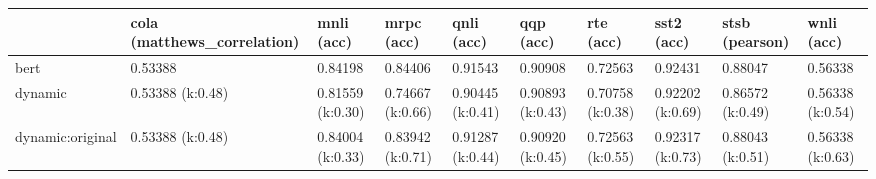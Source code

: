 \begin{tabular}{llllllllll}
\toprule
{} & cola (matthews\_correlation) &        mnli (acc) &        mrpc (acc) &        qnli (acc) &         qqp (acc) &         rte (acc) &        sst2 (acc) &    stsb (pearson) &        wnli (acc) \\
\midrule
bert             &                     0.53388 &           0.84198 &           0.84406 &           0.91543 &           0.90908 &           0.72563 &           0.92431 &           0.88047 &           0.56338 \\
dynamic          &            0.53388 (k:0.48) &  0.81559 (k:0.30) &  0.74667 (k:0.66) &  0.90445 (k:0.41) &  0.90893 (k:0.43) &  0.70758 (k:0.38) &  0.92202 (k:0.69) &  0.86572 (k:0.49) &  0.56338 (k:0.54) \\
dynamic:original &            0.53388 (k:0.48) &  0.84004 (k:0.33) &  0.83942 (k:0.71) &  0.91287 (k:0.44) &  0.90920 (k:0.45) &  0.72563 (k:0.55) &  0.92317 (k:0.73) &  0.88043 (k:0.51) &  0.56338 (k:0.63) \\
\bottomrule
\end{tabular}

